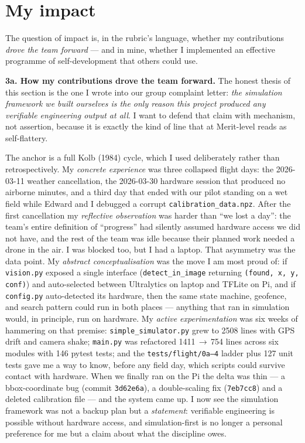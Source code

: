 \section{My impact}

The question of impact is, in the rubric's language, whether my contributions \emph{drove the team forward} --- and in mine, whether I implemented an effective programme of self-development that others could use.

\textbf{3a. How my contributions drove the team forward.} The honest thesis of this section is the one I wrote into our group complaint letter: \emph{the simulation framework we built ourselves is the only reason this project produced any verifiable engineering output at all}. I want to defend that claim with mechanism, not assertion, because it is exactly the kind of line that at Merit-level reads as self-flattery.

The anchor is a full Kolb (1984) cycle, which I used deliberately rather than retrospectively. My \emph{concrete experience} was three collapsed flight days: the 2026-03-11 weather cancellation, the 2026-03-30 hardware session that produced no airborne minutes, and a third day that ended with our pilot standing on a wet field while Edward and I debugged a corrupt \texttt{calibration\_data.npz}. After the first cancellation my \emph{reflective observation} was harder than ``we lost a day'': the team's entire definition of ``progress'' had silently assumed hardware access we did not have, and the rest of the team was idle because their planned work needed a drone in the air. I was blocked too, but I had a laptop. That asymmetry was the data point. My \emph{abstract conceptualisation} was the move I am most proud of: if \texttt{vision.py} exposed a single interface (\texttt{detect\_in\_image} returning \texttt{(found, x, y, conf)}) and auto-selected between Ultralytics on laptop and TFLite on Pi, and if \texttt{config.py} auto-detected its hardware, then the same state machine, geofence, and search pattern could run in both places --- anything that ran in simulation would, in principle, run on hardware. My \emph{active experimentation} was six weeks of hammering on that premise: \texttt{simple\_simulator.py} grew to 2508 lines with GPS drift and camera shake; \texttt{main.py} was refactored 1411\,$\to$\,754 lines across six modules with 146 pytest tests; and the \texttt{tests/flight/0a--4} ladder plus 127 unit tests gave me a way to know, before any field day, which scripts could survive contact with hardware. When we finally ran on the Pi the delta was thin --- a bbox-coordinate bug (commit \texttt{3d62e6a}), a double-scaling fix (\texttt{7eb7cc8}) and a deleted calibration file --- and the system came up. I now see the simulation framework was not a backup plan but a \emph{statement}: verifiable engineering is possible without hardware access, and simulation-first is no longer a personal preference for me but a claim about what the discipline owes.

